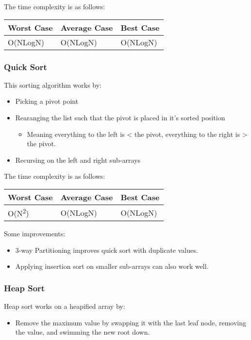 \documentclass[11pt]{article}
\begin{document}
The time complexity is as follows:
\begin{center}
\begin{tabular}{lll}
Worst Case & Average Case & Best Case\\
\hline
O(NLogN) & O(NLogN) & O(NLogN)\\
\end{tabular}
\end{center}
\subsubsection*{Quick Sort}
\label{sec:org59f08ca}
This sorting algorithm works by:
\begin{itemize}
\item Picking a pivot point
\item Rearanging the list such that the pivot is placed in it's sorted position
\begin{itemize}
\item Meaning everything to the left is < the pivot, everything to the right is > the pivot.
\end{itemize}
\item Recursing on the left and right sub-arrays
\end{itemize}

The time complexity is as follows:
\begin{center}
\begin{tabular}{lll}
Worst Case & Average Case & Best Case\\
\hline
O(N\textsuperscript{2}) & O(NLogN) & O(NLogN)\\
\end{tabular}
\end{center}

Some improvements:
\begin{itemize}
\item 3-way Partitioning improves quick sort with duplicate values.
\item Applying insertion sort on smaller sub-arrays can also work well.
\end{itemize}

\subsubsection*{Heap Sort}
\label{sec:org3f49981}
Heap sort works on a heapified array by:
\begin{itemize}
\item Remove the maximum value by swapping it with the last leaf node, removing the value, and swimming the new root down.
\end{itemize}
\end{document}

